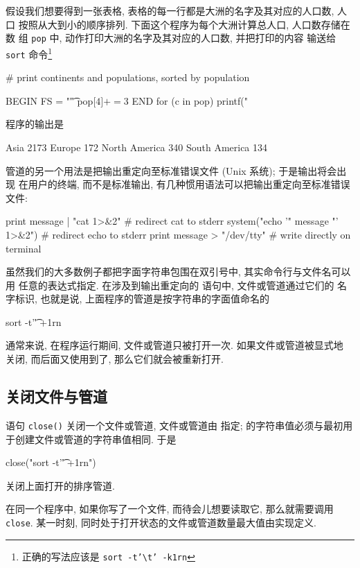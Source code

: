 假设我们想要得到一张表格, 表格的每一行都是大洲的名字及其对应的人口数, 人口
按照从大到小的顺序排列. 下面这个程序为每个大洲计算总人口, 人口数存储在数
组 \verb'pop' 中, \END 动作打印大洲的名字及其对应的人口数, 并把打印的内容
输送给 \verb'sort' 命令\footnote{正确的写法应该是 \texttt{sort
-t'}\texttt{\textbackslash}\texttt{t' -k1rn}}
\begin{awkcode}
    # print continents and populations, sorted by population

    BEGIN { FS = "\t" }
          { pop[$4] += $3 }
    END   { for (c in pop)
              printf("%
          }
\end{awkcode}
程序的输出是
\begin{awkcode}
           Asia	  2173
         Europe	   172
  North America	   340
  South America	   134
\end{awkcode}

管道的另一个用法是把输出重定向至标准错误文件 (Unix 系统); 于是输出将会出现
在用户的终端, 而不是标准输出, 有几种惯用语法可以把输出重定向至标准错误文件:
\begin{awkcode}
    print message | "cat 1>&2"          # redirect cat to stderr
    system("echo '" message "' 1>&2")   # redirect echo to stderr
    print message > "/dev/tty"          # write directly on terminal
\end{awkcode}

虽然我们的大多数例子都把字面字符串包围在双引号中, 其实命令行与文件名可以用
任意的表达式指定. 在涉及到输出重定向的 \print 语句中, 文件或管道通过它们的
名字标识, 也就是说, 上面程序的管道是按字符串的字面值命名的
\begin{awkcode}
    sort -t'\t' +1rn
\end{awkcode}
通常来说, 在程序运行期间, 文件或管道只被打开一次. 如果文件或管道被显式地
关闭, 而后面又使用到了, 那么它们就会被重新打开.

\subsection{关闭文件与管道}
\label{subsec:closing_files_and_pipes}

语句 \verb'close('\expr\verb')' 关闭一个文件或管道, 文件或管道由 
\expr 指定; \expr 的字符串值必须与最初用于创建文件或管道的字符串值相同.
于是 
\begin{awkcode}
    close("sort -t'\t' +1rn")
\end{awkcode}
关闭上面打开的排序管道.

在同一个程序中, 如果你写了一个文件, 而待会儿想要读取它, 那么就需要调用
\verb'close'. 某一时刻, 同时处于打开状态的文件或管道数量最大值由实现定义.

